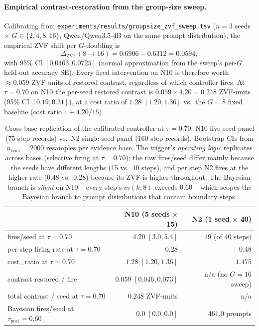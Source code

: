 \paragraph{Empirical contrast-restoration from the group-size sweep.}
Calibrating from
\texttt{experiments/results/groupsize\_zvf\_sweep.tsv}
($n{=}3$ seeds $\times$ $G \in \{2, 4, 8, 16\}$, Qwen/Qwen3.5-4B
on the same prompt distribution), the empirical ZVF shift per
$G$-doubling is
\[
\Delta_{\mathrm{ZVF}}(8 \to 16) = 0.6906 - 0.6312 = 0.0594,
\]
with 95\% CI $[0.0463, 0.0725]$ (normal approximation from the
sweep's per-$G$ held-out accuracy SE). Every fired intervention
on N10 is therefore worth $\approx 0.059$ ZVF units of restored
contrast, regardless of which controller fires. At $\tau{=}0.70$
on N10 the per-seed restored contrast is
$0.059 \times 4.20 = 0.248$ ZVF-units (95\% CI $[0.19, 0.31]$),
at a cost ratio of $1.28$ $[1.20, 1.36]$ vs.\ the $G{=}8$
fixed baseline (cost ratio $1 + 4.20/15$).

\begin{table}[t]
\centering
\caption{Cross-base replication of the calibrated controller at
$\tau{=}0.70$: N10 five-seed panel (75 step-records) vs.\ N2
single-seed panel (160 step-records). Bootstrap CIs from $n_{\text{boot}}{=}2000$
resamples per evidence base. The trigger's \emph{operating logic}
replicates across bases (selective firing at $\tau{=}0.70$); the
raw fires/seed differ mainly because the seeds have different
lengths (15 vs.\ 40 steps), and per step N2 fires at the higher
rate (0.48 vs.\ 0.28) because its ZVF is higher throughout. The
Bayesian branch is \emph{silent} on N10 -- every step's $m(k, 8)$
exceeds $0.60$ -- which scopes the Bayesian branch to prompt
distributions that contain boundary steps.}
\label{tab:p7-cross-base}
\begin{tabular}{lrr}
\toprule
 & \textbf{N10 (5 seeds $\times$ 15)} & \textbf{N2 (1 seed $\times$ 40)} \\
\midrule
fires/seed at $\tau{=}0.70$         & $4.20$ $[3.0, 5.4]$    & $19$ (of 40 steps)   \\
per-step firing rate at $\tau{=}0.70$ & $0.28$               & $0.48$               \\
cost\_ratio at $\tau{=}0.70$        & $1.28$ $[1.20, 1.36]$  & $1.475$               \\
contrast restored / fire            & $0.059$ $[0.046, 0.073]$ & n/a (no $G{=}16$ sweep) \\
total contrast / seed at $\tau{=}0.70$ & $0.248$ ZVF-units     & n/a                   \\
Bayesian fires/seed at $\tau_{\text{post}}{=}0.60$ & $0.0$ $[0.0, 0.0]$ & $461.0$ prompts \\
\bottomrule
\end{tabular}
\end{table}

